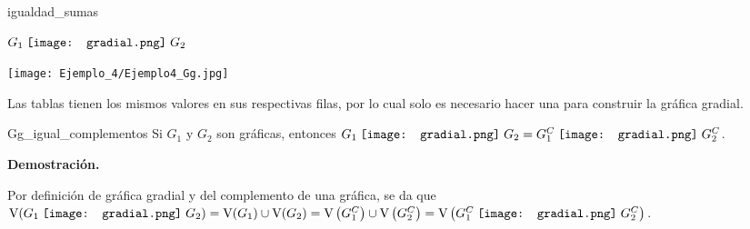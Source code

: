 \documentclass[fleqn, 11pt]{beamer}
\newcommand{\gradial}{\hspace{0.9mm} \texttt{[image: gradial.png]} \hspace{1mm}}
\begin{document}
\begin{ejemplo}[beforeafter skip = 4mm]{}{igualdad_sumas}
\begin{center}
\begin{minipage}[h]{0.25\linewidth}
                $ G_1 \gradial G_2 $

                \texttt{[image: Ejemplo\_4/Ejemplo4\_Gg.jpg]}
            \end{minipage}
        \end{center} \vspace{3mm}

        Las tablas tienen los mismos valores en sus respectivas filas, por lo cual solo es necesario hacer una para construir la gráfica gradial.
    \end{ejemplo}

    \begin{teorema}[breakable, pad at break = 4mm, beforeafter skip = 4mm]{}{Gg_igual_complementos}
        Si $ G_1 $ y $ G_2 $ son gráficas, entonces $ G_1 \gradial G_2 = G_1^C \gradial G_2^C $.

        \tcblower

        \textbf{Demostración.} \vspace{3mm}

        Por definición de gráfica gradial y del complemento de una gráfica, se da que $ \textnormal{V}(G_1 \gradial G_2) = \textnormal{V}(G_1) \cup \textnormal{V}(G_2) = \textnormal{V}\left( G_1^C \right) \cup \textnormal{V}\left( G_2^C \right) = \textnormal{V}\left( G_1^C \gradial G_2^C \right) $. \vspace{2mm}


\end{teorema}
\end{document}
